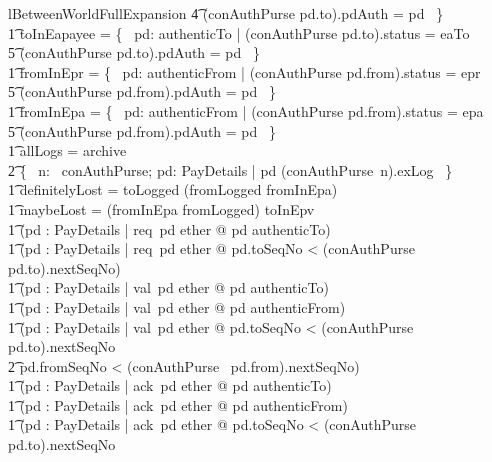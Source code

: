 \begin{LNewLemma}
\begin{theorem}{lBetweenWorldFullExpansion}
                    \t4 \land (conAuthPurse pd.to).pdAuth = pd ~\} \land \\ \t1
            toInEapayee = \{~ pd: authenticTo | (conAuthPurse pd.to).status = eaTo \\
                    \t5 \land (conAuthPurse pd.to).pdAuth = pd ~\} \land \\ \t1
            fromInEpr = \{~ pd: authenticFrom | (conAuthPurse pd.from).status = epr \\
                    \t5 \land (conAuthPurse pd.from).pdAuth = pd ~\} \land \\ \t1
            fromInEpa = \{~ pd: authenticFrom | (conAuthPurse pd.from).status = epa \\
                    \t5 \land (conAuthPurse pd.from).pdAuth = pd ~\} \land \\ \t1
            allLogs = archive \cup \\
                \t2 \{~ n: \dom~conAuthPurse; pd: PayDetails | pd \in (conAuthPurse~n).exLog ~\} \land \\ \t1
            definitelyLost = toLogged \cap (fromLogged \cup fromInEpa) \land \\ \t1
            maybeLost = (fromInEpa \cup fromLogged) \cap toInEpv \land \\
    \t1
            (\forall pd : PayDetails | req~pd \in ether @ pd \in authenticTo)
            \land \\ \t1
            (\forall pd : PayDetails | req~pd \in ether @
                 pd.toSeqNo < (conAuthPurse~ pd.to).nextSeqNo) \\ \t1
            \land
            (\forall pd : PayDetails | val~pd \in ether @ pd \in authenticTo) \land \\ \t1
            (\forall pd : PayDetails | val~pd \in ether @ pd \in authenticFrom) \land \\ \t1
            (\forall pd : PayDetails | val~pd \in ether @ pd.toSeqNo < (conAuthPurse~ pd.to).nextSeqNo \\
                \t2 \land pd.fromSeqNo < (conAuthPurse~ pd.from).nextSeqNo) \land \\ \t1
            (\forall pd : PayDetails | ack~pd \in ether @ pd \in authenticTo)\land  \\ \t1
            (\forall pd : PayDetails | ack~pd \in ether @ pd \in authenticFrom) \land \\ \t1
            (\forall pd : PayDetails | ack~pd \in ether @ pd.toSeqNo < (conAuthPurse~ pd.to).nextSeqNo  \\ %

\end{theorem}
\end{LNewLemma}
